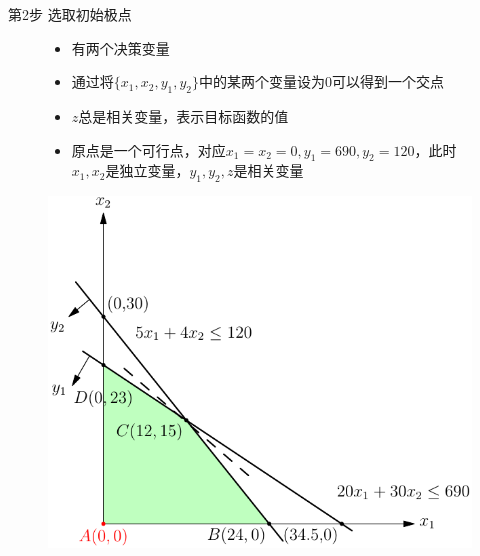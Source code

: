 \documentclass[mathserif, table]{beamer}
\begin{document}
\begin{frame}{第2步 选取初始极点}

  \begin{figure}
    \begin{minipage}{.5\linewidth}
      \begin{itemize}
      \item 有两个决策变量
      \item 通过将$\{x_1, x_2, y_1, y_2\}$中的某两个变量设为0可以得到一个交点
      \item $z$总是相关变量，表示目标函数的值
      \item 原点是一个可行点，对应$x_1=x_2=0, y_1=690, y_2=120$，此时$x_1, x_2$是独立变量，$y_1, y_2, z$是相关变量
      \end{itemize}
    \end{minipage}%
    \begin{minipage}{.5\linewidth}
      \includegraphics[width=\textwidth{}]{simplex-init.pdf}
    \end{minipage}
  \end{figure}

  
\end{frame}
\end{document}
